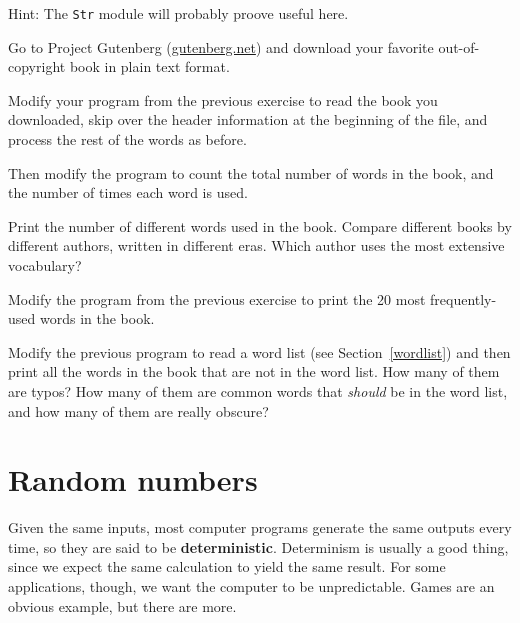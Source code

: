 \documentclass[10pt]{book}
\begin{document}
{\begin{ex}

Hint: The {\tt Str} module will probably proove useful here.
\end{ex}


\begin{ex}


Go to Project Gutenberg (\url{gutenberg.net}) and download 
your favorite out-of-copyright book in plain text format.


Modify your program from the previous exercise to read the book
you downloaded, skip over the header information at the beginning
of the file, and process the rest of the words as before.

Then modify the program to count the total number of words in
the book, and the number of times each word is used.


Print the number of different words used in the book.  Compare
different books by different authors, written in different eras.
Which author uses the most extensive vocabulary?
\end{ex}


\begin{ex}
Modify the program from the previous exercise to print the
20 most frequently-used words in the book.
\end{ex}


\begin{ex}
Modify the previous program to read a word list (see
Section~\ref{wordlist}) and then print all the words in the book that
are not in the word list.  How many of them are typos?  How many of
them are common words that {\em should} be in the word list, and how
many of them are really obscure?
\end{ex}


\section{Random numbers}


Given the same inputs, most computer programs generate the same
outputs every time, so they are said to be {\bf deterministic}.
Determinism is usually a good thing, since we expect the same
calculation to yield the same result.  For some applications, though,
we want the computer to be unpredictable.  Games are an obvious
example, but there are more.

}
\end{document}
